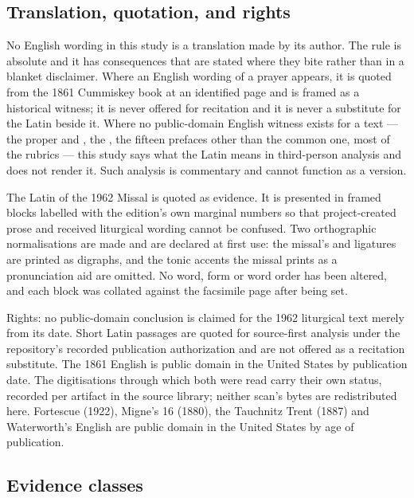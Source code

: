 \subsection*{Translation, quotation, and rights}

No English wording in this study is a translation made by its author. The rule
is absolute and it has consequences that are stated where they bite rather than
in a blanket disclaimer. Where an English wording of a prayer appears, it is
quoted from the 1861 Cummiskey book at an identified page and is framed as a
historical witness; it is never offered for recitation and it is never a
substitute for the Latin beside it. Where no public-domain English witness
exists for a text --- the proper  and , the , the fifteen prefaces other than the
common one, most of the rubrics --- this study says what the Latin means in
third-person analysis and does not render it. Such analysis is commentary and
cannot function as a version.

The Latin of the 1962 Missal is quoted as evidence. It is presented in framed
blocks labelled with the edition's own marginal numbers so that project-created
prose and received liturgical wording cannot be confused. Two orthographic
normalisations are made and are declared at first use: the missal's
 and  ligatures are printed as digraphs, and the
tonic accents the missal prints as a pronunciation aid are omitted. No word,
form or word order has been altered, and each block was collated against the
facsimile page after being set.

Rights: no public-domain conclusion is claimed for the 1962 liturgical text
merely from its date. Short Latin passages are quoted for source-first analysis
under the repository's recorded publication authorization and are not offered
as a recitation substitute. The 1861 English is public domain in the United
States by publication date. The digitisations through which both were read
carry their own status, recorded per artifact in the source library; neither
scan's bytes are redistributed here. Fortescue (1922),
Migne's  16 (1880), the Tauchnitz Trent (1887) and
Waterworth's English are public domain in the United States by age of
publication.

\subsection*{Evidence classes}

